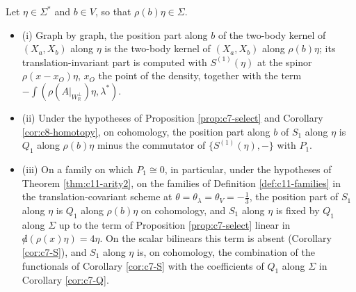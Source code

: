 \begin{proposition}
\label{prop:c11-S}
Let $\eta\in\Sigma^*$ and $b\in V$, so that $\rho(b)\eta\in\Sigma$.
\begin{itemize}
\item (i) Graph by graph, the position part along $b$ of the two-body kernel of $(X_a,X_b)$ along $\eta$ is the two-body kernel of $(X_a,X_b)$ along $\rho(b)\eta$; its translation-invariant part is computed with $S^{(1)}(\eta)$ at the spinor $\rho(x-x_O)\eta$, $x_O$ the point of the density, together with the term $-\int(\rho(A|_{W_{\mathbb R}^\perp})\eta,\lambda^*)$.
\item (ii) Under the hypotheses of Proposition \ref{prop:c7-select} and Corollary \ref{cor:c8-homotopy}, on cohomology, the position part along $b$ of $S_1$ along $\eta$ is $Q_1$ along $\rho(b)\eta$ minus the commutator of $\{S^{(1)}(\eta),-\}$ with $P_1$.
\item (iii) On a family on which $P_1\cong0$, in particular, under the hypotheses of Theorem \ref{thm:c11-arity2}, on the families of Definition \ref{def:c11-families} in the translation-covariant scheme at $\theta=\theta_\lambda=\theta_V=-\tfrac13$, the position part of $S_1$ along $\eta$ is $Q_1$ along $\rho(b)\eta$ on cohomology, and $S_1$ along $\eta$ is fixed by $Q_1$ along $\Sigma$ up to the term of Proposition \ref{prop:c7-select} linear in ${\not d}(\rho(x)\eta)=4\eta$. On the scalar bilinears this term is absent (Corollary \ref{cor:c7-S}), and $S_1$ along $\eta$ is, on cohomology, the combination of the functionals of Corollary \ref{cor:c7-S} with the coefficients of $Q_1$ along $\Sigma$ in Corollary \ref{cor:c7-Q}.
\end{itemize}
\end{proposition}

